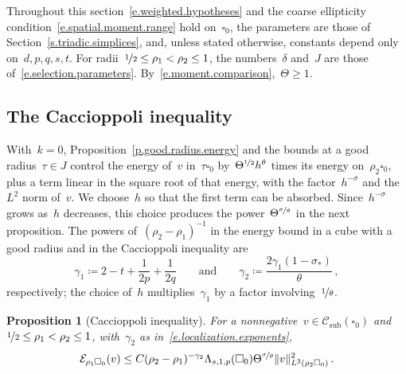 \documentclass[11pt,letterpaper]{article}
\numberwithin{equation}{section}
\newtheorem{proposition}[theorem]{Proposition}
\theoremstyle{definition}
\newcommand{\nf}{\nicefrac}
\newcommand{\cu}{\square}
\DeclarePairedDelimiter{\norm}{\lVert}{\rVert}
\newcommand{\Ener}{\mathcal E}
\newcommand{\Csub}{\mathcal C_{\mathrm{sub}}}
\begin{document}
Throughout this section~\eqref{e.weighted.hypotheses} and the coarse ellipticity condition~\eqref{e.spatial.moment.range} hold on~$\cu_0$, the parameters are those of Section~\ref{s.triadic.simplices}, and, unless stated otherwise, constants depend only on~$d,p,q,s,t$. For radii~$\nf12\leq\rho_1<\rho_2\leq1$, the numbers~$\delta$ and~$J$ are those of~\eqref{e.selection.parameters}. By~\eqref{e.moment.comparison},~$\Theta\geq1$.

\subsection{The Caccioppoli inequality}

With~$k=0$, Proposition~\ref{p.good.radius.energy} and the bounds at a good radius~$\tau\in J$ control the energy of~$v$ in~$\tau\cu_0$ by~$\Theta^{\nf12}h^\theta$ times its energy on~$\rho_2\cu_0$, plus a term linear in the square root of that energy, with the factor~$h^{-\sigma}$ and the~$L^2$ norm of~$v$. We choose~$h$ so that the first term can be absorbed. Since~$h^{-\sigma}$ grows as~$h$ decreases, this choice produces the power~$\Theta^{\nf\sigma\theta}$ in the next proposition. The powers of~$(\rho_2-\rho_1)^{-1}$ in the energy bound in a cube with a good radius and in the Caccioppoli inequality are
\begin{equation}
	\gamma_1\coloneqq2-t+\frac1{2p}+\frac1{2q}\qquad\mbox{and}\qquad \gamma_2\coloneqq\frac{2\gamma_1(1-\sigma_*)}{\theta}\,,
	\label{e.localization.exponents}
\end{equation}
respectively; the choice of~$h$ multiplies~$\gamma_1$ by a factor involving~$\nf1\theta$.

\begin{proposition}[Caccioppoli inequality]
\label{p.cg.caccioppoli}
For a nonnegative~$v\in\Csub(\cu_0)$ and~$\nf12\leq\rho_1<\rho_2\leq1$, with~$\gamma_2$ as in~\eqref{e.localization.exponents},
\begin{equation}
	\Ener_{\rho_1\cu_0}(v)\leq C(\rho_2-\rho_1)^{-\gamma_2}\Lambda_{s,1,p}(\cu_0)\Theta^{\nf\sigma\theta}\norm{v}_{L^2(\rho_2\cu_0)}^2\,.
	\label{e.cg.caccioppoli}
\end{equation}
\end{proposition}
\end{document}
